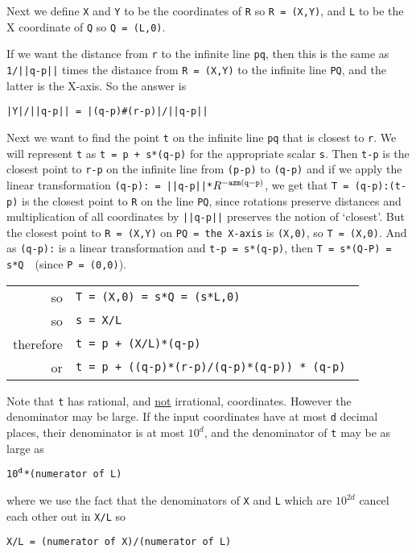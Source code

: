 \documentclass[12pt]{article}
\begin{document}
Next we define {\tt X} and {\tt Y} to be the coordinates of {\tt R}
so {\tt R = (X,Y)}, and {\tt L} to be the X coordinate of {\tt Q}
so {\tt Q = (L,0)}.

If\label{DISTANCE-OF-LINE-TO-POINT}
we want the distance from {\tt r} to the infinite line {\tt pq},
then this is the same as {\tt 1/||q-p||} times
the distance from {\tt R = (X,Y)} to the infinite
line {\tt PQ}, and the latter is the X-axis.  So the answer is \\
\centerline{\tt |Y|/||q-p|| = |(q-p)\#(r-p)|/||q-p||}

Next we want to find the point {\tt t} on the infinite line {\tt pq}
that is closest to {\tt r}.  We will represent {\tt t} as {\tt t = p + s*(q-p)}
for the appropriate scalar {\tt s}.  Then {\tt t-p} is the closest point to
{\tt r-p} on the infinite line from {\tt (p-p)} to {\tt (q-p)}
and if we apply the
linear transformation {\tt (q-p):~= ||q-p||*$R^{\tt -azm (q-p)}$},
we get that {\tt T = (q-p):(t-p)} is the closest point to {\tt R} on the
line {\tt PQ}, since rotations preserve distances and multiplication
of all coordinates by {\tt ||q-p||} preserves the notion of `closest'.
But the closest point to {\tt R = (X,Y)} on {\tt PQ = {\rm the X-axis}}
is {\tt (X,0)}, so {\tt T = (X,0)}.
And as {\tt (q-p):} is a linear transformation and {\tt t-p = s*(q-p)},
then {\tt T = s*(Q-P) = s*Q}~~(since {\tt P = (0,0)}).

\hspace*{0.3in}\begin{tabular}{rl}
so	& \tt T = (X,0) = s*Q = (s*L,0) \\
so	& \tt s = X/L \\
therefore     & \tt t = p + (X/L)*(q-p) \\
or	& \tt t = p + ((q-p)*(r-p)/(q-p)*(q-p)) * (q-p) \\
\end{tabular}

Note that {\tt t} has rational\label{CLOSEST-IS-RATIONAL},
and \underline{not} irrational,
coordinates.  However the denominator may be large.  If
the input coordinates have at most {\tt d} decimal places,
their denominator is at most $10^d$, and the denominator of {\tt t}
may be as large as \\
\centerline{\tt 10$^{\tt d}$*({\rm numerator of} L)}
where we use the fact that the denominators of {\tt X} and {\tt L}
which are $10^{2d}$ cancel each other out in {\tt X/L} so \\
\centerline{\tt X/L = ({\rm numerator of} X)/({\rm numerator of} L)}
\end{document}
